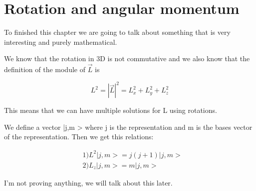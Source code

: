 \section{Rotation and angular momentum}

To finished this chapter we are going to talk about something that is very interesting and purely mathematical.

We know that the rotation in 3D is not commutative and we also know that the definition of the module of $\vec{L}$ is

\begin{equation}
    \label{module_L}
    L^2=|\Vec{L}|^2=L_{x}^2+L_{y}^2+L_{z}^2
\end{equation}

This means that we can have multiple solutions for L using rotations.

We define a vector |j,m > where j is the representation and m is the bases vector of the representation. Then we get this relations:

\begin{equation}
\label{jm_vec}
    \begin{split}
        &1) L^2| j,m > = j(j+1)| j,m >\\
        &2) L_z| j,m > = m | j,m >
    \end{split}
\end{equation}

I'm not proving anything, we will talk about this later.



